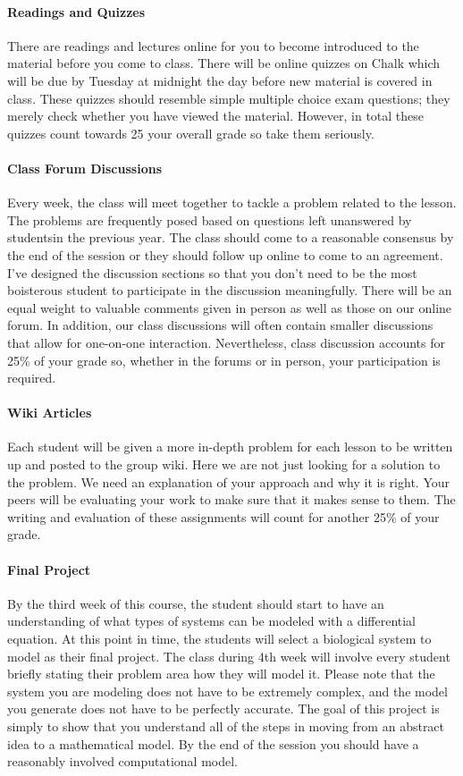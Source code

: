 \paragraph{Readings and Quizzes}
There are readings and lectures online for you to become introduced to the material
before you come to class. There will be online quizzes on Chalk which will be due by
Tuesday at midnight the day before new material is covered in class. These quizzes
should resemble simple multiple choice exam questions; they merely check whether
you have viewed the material. However, in total these quizzes count towards 25%
your overall grade so take them seriously.

\paragraph{Class Forum Discussions}
Every week, the class will meet together to tackle a problem related to the lesson.
The problems are frequently posed based on questions left unanswered by studentsin the previous year. The class should come to a reasonable consensus by the end of the session or they should follow up online to come to an agreement. I’ve designed the discussion sections so that you don’t need to be the most boisterous student to participate in the discussion meaningfully. There will be an
equal weight to valuable comments given in person as well as those on our online forum. In addition, our class discussions will often contain smaller discussions that allow for one-on-one interaction. Nevertheless, class discussion accounts for 25\% of
your grade so, whether in the forums or in person, your participation is required.

\paragraph{Wiki Articles}
Each student will be given a more in-depth problem for each lesson to be written up
and posted to the group wiki. Here we are not just looking for a solution to the
problem. We need an explanation of your approach and why it is right. Your peers will
be evaluating your work to make sure that it makes sense to them. The writing and
evaluation of these assignments will count for another 25\% of your grade.

\paragraph{Final Project}
By the third week of this course, the student should start to have an understanding of
what types of systems can be modeled with a differential equation. At this point in
time, the students will select a biological system to model as their final project. The
class during 4th week will involve every student briefly stating their problem area how
they will model it.  Please note that the system you are modeling does not
have to be extremely complex, and the model you generate does not have to be
perfectly accurate. The goal of this project is simply to show that you understand all
of the steps in moving from an abstract idea to a mathematical model. By the end of
the session you should have a reasonably involved computational model.



